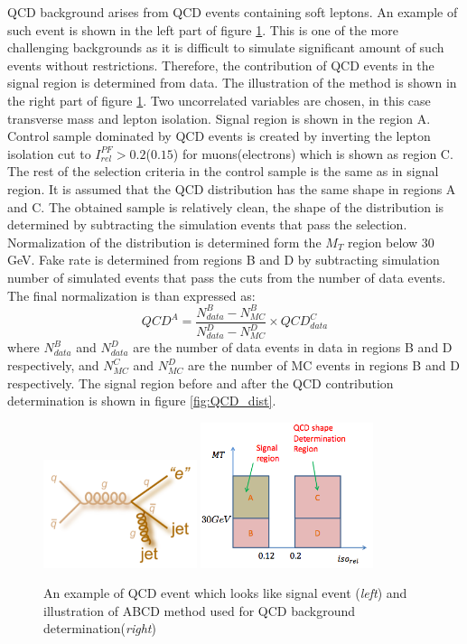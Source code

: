 QCD background arises from QCD events containing soft leptons. An example of such event is shown in the left part of figure \ref{fig:QCD}. This is one of the more challenging backgrounds as it is difficult to simulate significant amount of such events without restrictions. Therefore, the contribution of QCD events in the signal region is determined from data. The illustration of the method is shown in the right part of figure \ref{fig:QCD}. Two uncorrelated variables are chosen, in this case transverse mass and lepton isolation. Signal region is shown in the region A. Control sample dominated by QCD events is created by inverting the lepton isolation cut to $I_{rel}^{PF}>0.2$($0.15$) for muons(electrons) which is shown as region C. The rest of the selection criteria in the control sample is the same as in signal region. It is assumed that the QCD distribution has the same shape in regions A and C. The obtained sample is relatively clean, the shape of the distribution is determined by subtracting the simulation events that pass the selection. Normalization of the distribution is determined form the $M_T$ region below 30 GeV. Fake rate is determined from regions B and D by subtracting simulation number of simulated events that pass the cuts from the number of data events. The final normalization is than expressed as:
\begin{equation}
QCD^A=\frac{N^B_{data}-N^B_{MC}}{N^D_{data}-N^D_{MC}}\times QCD^{C}_{data}
\end{equation}       
where $N^B_{data}$ and $N^D_{data}$ are the number of data events in data in regions B and D respectively, and $N^C_{MC}$ and $N^D_{MC}$ are the number of MC events in regions B and D respectively. The signal region before and after the QCD contribution determination is shown in figure \ref{fig:QCD_dist}.
\begin{figure}[htbp]
	\centering
		\includegraphics[width=0.4\textwidth]{Figures/QCD_diag.png}
		\includegraphics[width=0.45\textwidth]{Figures/QCD_AB.png}		
	\caption[QCD diagram and illustration of QCD background determination]{An example of QCD event which looks like signal event (\textit{left}) and illustration of ABCD method used for QCD background determination(\textit{right})}
	\label{fig:QCD}
\end{figure} 

